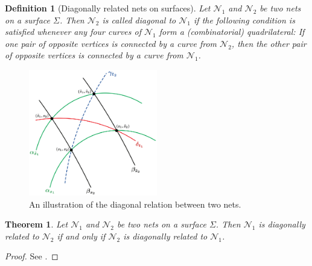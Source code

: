 \documentclass[10pt, a4paper]{article}
\theoremstyle{BoldTopSpacing}
\newtheorem{theorem}{Theorem}[section]
\theoremstyle{BoldTopSpacing}
\theoremstyle{BoldTopSpacing}
\theoremstyle{BoldTopBottomSpacing}
\newtheorem{definition}{Definition}[section]
\theoremstyle{BoldTopSpacing}
\theoremstyle{BoldTopBottomSpacing}
\theoremstyle{remark}
\begin{document}
\begin{definition}[Diagonally related nets on surfaces]
\label{def:diag-nets-on-surfaces}
Let $\mathcal{N}_{1}$ and $\mathcal{N}_{2}$ be two nets on a surface $\Sigma$. Then $\mathcal{N}_{2}$ is called diagonal
to $\mathcal{N}_{1}$ if the following condition is satisfied whenever any four curves of $\mathcal{N}_{1}$ form a
(combinatorial) quadrilateral: \newline
If one pair of opposite vertices is connected by a curve from $\mathcal{N}_{2}$, then the other pair of opposite vertices is connected by a curve from $\mathcal{N}_{1}$.
\end{definition}

\begin{figure}[H]
    \centering
    \includegraphics[width=0.5\textwidth]{diagonally_related_diagram.png}
    \caption{An illustration of the diagonal relation between two nets.}
    \label{fig:diagonally-related-diagram}
\end{figure}

\begin{theorem}
\label{thm:symmetric-definition-diagonal-nets}
Let $\mathcal{N}_1$ and $\mathcal{N}_2$ be two nets on a surface $\Sigma$. Then $\mathcal{N}_1$ is diagonally related to
$\mathcal{N}_2$ if and only if $\mathcal{N}_2$ is diagonally related to $\mathcal{N}_1$.
\end{theorem}

\begin{proof}
    See \cite[\textcolor{CitationColor}{Theorem~8.2.}]{geometryIII}.
\end{proof}
\end{document}
